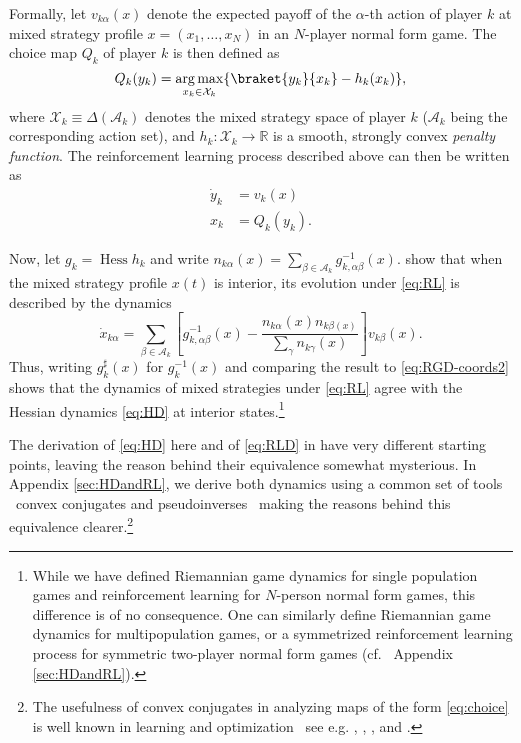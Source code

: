 \documentclass[reqno]{amsart}
\theoremstyle{plain}
\theoremstyle{definition}
\theoremstyle{remark}
\numberwithin{equation}{section}
\numberwithin{theorem}{section}
\begin{document}
Formally, let ${v}_{k\alpha}(x)$ denote the expected payoff of the $\alpha$-th action of player $k$ at mixed strategy profile $x = (x_{1},\dotsc, x_{N})$ in an $N$-player normal form game.
The choice map ${Q}_{k}$ of player $k$ is then defined as
\begin{equation}
\label{eq:choice}
{Q}_{k}(y_{k})
	= \operatorname*{arg\,max}_{x_k \in {\mathcal{X}}_k} \{\braket{y_{k}}{x_{k}} - h_k(x_{k}) \},
\end{equation}
where ${\mathcal{X}}_{k} \equiv {\Delta}({\mathcal{A}}_{k})$ denotes the mixed strategy space of player $k$ (${\mathcal{A}}_{k}$ being the corresponding action set), and $h_{k}{\colon}{\mathcal{X}}_k\to{\mathbb{R}}$ is a smooth, strongly convex \emph{penalty function}.
The reinforcement learning process described above can then be written as
\begin{equation}
\label{eq:RL}
\tag{RL}
\begin{aligned}
\dot y_{k}
	&= {v}_{k}(x)
	\\
x_{k}
	&= {Q}_{k}(y_{k}).
\end{aligned}
\end{equation}

Now, let $g_{k} = \operatorname{Hess} h_{k}$ and write ${n}_{k\alpha}(x) = \sum_{\beta\in{\mathcal{A}}_{k}} g_{k,\alpha\beta}^{-1}(x)$.
\cite{MS16} show that when the mixed strategy profile $x(t)$ is interior, its evolution under \eqref{eq:RL} is described by the dynamics
\begin{equation}
\label{eq:RLD}
\tag{RLD}
\dot x_{k\alpha}
	= \sum_{\beta\in{\mathcal{A}}_{k}} \left[
		g_{k,\alpha\beta}^{-1}(x) - \frac{{n}_{k\alpha}(x) {n}_{k\beta(x)}}{\sum_{\gamma} {n}_{k\gamma}(x)}
	\right]
	{v}_{k\beta}(x).
\end{equation}
Thus, writing $g_{k}^{\sharp}(x)$ for $g_{k}^{-1}(x)$ and comparing the result to  \eqref{eq:RGD-coords2} shows that the dynamics of mixed strategies under \eqref{eq:RL} agree with the Hessian dynamics \eqref{eq:HD} at interior states.\footnote{While we have defined Riemannian game dynamics for single population games and reinforcement learning for $N$-person normal form games, this difference is of no consequence.
One can similarly define Riemannian game dynamics for multipopulation games, or a symmetrized reinforcement learning process for symmetric two-player normal form games (cf.~ Appendix \ref{sec:HDandRL}).}

The derivation of \eqref{eq:HD} here and of \eqref{eq:RLD} in \cite{MS16} have very different starting points, leaving the reason behind their equivalence somewhat mysterious.   
In Appendix \ref{sec:HDandRL}, we derive both dynamics using a common set of tools \textendash\ convex conjugates and pseudoinverses \textendash\ making the reasons behind this equivalence clearer.\footnote{The usefulness of convex conjugates in analyzing maps of the form \eqref{eq:choice} is well known in learning and optimization \textendash\ see e.g. \cite{NY83}, \cite{HS02}, \cite{SS11}, and \cite{KM14}.}
\end{document}
